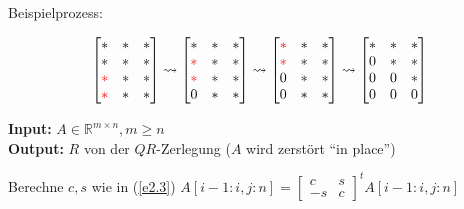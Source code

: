 \documentclass{book}
\def\R{\mathbb{R}}
\begin{document}
            Beispielprozess:

            \[
            \begin{bmatrix}
                * & * & * \\
                * & * & * \\
                \color{red}* & * & * \\
                \color{red}* & * & * \\
            \end{bmatrix}
            \rightsquigarrow
            \begin{bmatrix}
                * & * & * \\
                \color{red}* & * & * \\
                \color{red}* & * & * \\
                0 & * & * \\
            \end{bmatrix}
            \rightsquigarrow
            \begin{bmatrix}
                \color{red}* & * & * \\
                \color{red}* & * & * \\
                0 & * & * \\
                0 & * & * \\
            \end{bmatrix}
            \rightsquigarrow
            \begin{bmatrix}
                * & * & * \\
                0 & * & * \\
                0 & 0 & * \\
                0 & 0 & 0 \\
            \end{bmatrix}
            \]

            \begin{algorithm}[H]\label{a2.13}
                \caption{}
                \textbf{Input:} $A\in\R^{m\times n},m\geq n$\\
                \textbf{Output:} $R$ von der $QR$-Zerlegung ($A$ wird zerstört ``in place'')
                \begin{algorithmic}
                        \State Berechne $c,s$ wie in (\ref{e2.3})
                        \State $A[i-1:i,j:n]=\begin{bmatrix}
                            c & s \\
                            -s & c 
                        \end{bmatrix}^t A[i-1:i,j:n]$
                    \EndFor
                \EndFor
                \end{algorithmic}
            \end{algorithm}
\end{document}
